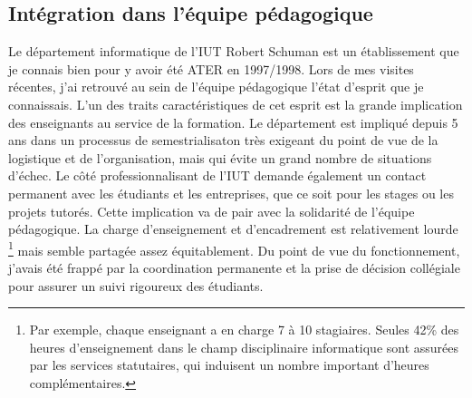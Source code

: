 \documentclass[11pt]{article}
\begin{document}
\subsection*{Intégration dans l'équipe pédagogique}

Le département informatique de l'IUT Robert Schuman est un établissement que je connais bien 
pour y avoir été ATER en 1997/1998. Lors de mes visites récentes, j'ai retrouvé au sein de 
l'équipe pédagogique l'état d'esprit que je connaissais. L'un des traits caractéristiques de 
cet esprit est la grande implication des enseignants au service de la formation. Le département 
est impliqué depuis 5 ans dans un processus de semestrialisaton très exigeant du point de vue de 
la logistique et de l'organisation, mais qui évite un grand nombre de situations d'échec. Le 
côté professionnalisant de l'IUT demande également un contact permanent avec les étudiants et 
les entreprises, que ce soit pour les stages ou les projets tutorés. Cette implication va de 
pair avec la solidarité de l'équipe pédagogique. La charge d'enseignement et d'encadrement est 
relativement lourde%
\footnote{Par exemple, chaque enseignant a en charge 7 à 10 stagiaires. Seules 42\% des heures 
d'enseignement dans le champ disciplinaire informatique sont assurées par les services statutaires,
qui induisent un nombre important d'heures complémentaires.}
mais semble partagée assez équitablement. Du point de vue du fonctionnement, j'avais été
frappé par la coordination permanente et la prise de décision collégiale pour assurer un suivi 
rigoureux des étudiants.\\
\end{document}
